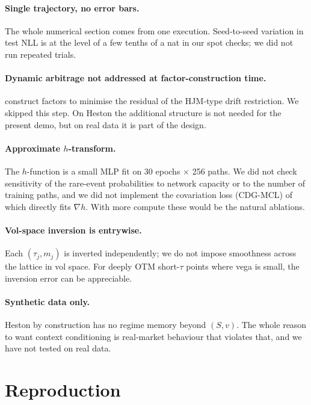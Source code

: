 \documentclass[11pt]{article}
\newcommand{\1}{\mathbf{1}}
\begin{document}
\paragraph{Single trajectory, no error bars.} The whole numerical section comes from one execution. Seed-to-seed variation in test NLL is at the level of a few tenths of a nat in our spot checks; we did not run repeated trials.

\paragraph{Dynamic arbitrage not addressed at factor-construction time.} \citet[\S 2.5]{cohen2021} construct factors to minimise the residual of the HJM-type drift restriction. We skipped this step. On Heston the additional structure is not needed for the present demo, but on real data it is part of the design.

\paragraph{Approximate $h$-transform.} The $h$-function is a small MLP fit on 30 epochs $\times$ 256 paths. We did not check sensitivity of the rare-event probabilities to network capacity or to the number of training paths, and we did not implement the covariation loss (CDG-MCL) of \citet{guo2026} which directly fits $\nabla h$. With more compute these would be the natural ablations.

\paragraph{Vol-space inversion is entrywise.} Each $(\tau_j, m_j)$ is inverted independently; we do not impose smoothness across the lattice in vol space. For deeply OTM short-$\tau$ points where vega is small, the inversion error can be appreciable.

\paragraph{Synthetic data only.} Heston by construction has no regime memory beyond $(S, v)$. The whole reason to want context conditioning is real-market behaviour that violates that, and we have not tested on real data.

\section{Reproduction}
\end{document}
